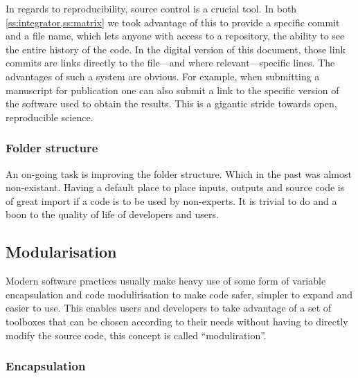 In regards to reproducibility, source control is a crucial tool. In both \cref{ss:integrator,ss:matrix} we took advantage of this to provide a specific commit and a file name, which lets anyone with access to a repository, the ability to see the entire history of the code. In the digital version of this document, those link commits are links directly to the file---and where relevant---specific lines. The advantages of such a system are obvious. For example, when submitting a manuscript for publication one can also submit a link to the specific version of the software used to obtain the results. This is a gigantic stride towards open, reproducible science.

\subsubsection{Folder structure}

An on-going task is improving the folder structure. Which in the past was almost non-existant. Having a default place to place inputs, outputs and source code is of great import if a code is to be used by non-experts. It is trivial to do and a boon to the quality of life of developers and users.

\subsection{Modularisation}

Modern software practices usually make heavy use of some form of variable encapsulation and code modulirisation to make code safer, simpler to expand and easier to use. This enables users and developers to take advantage of a set of toolboxes that can be chosen according to their needs without having to directly modify the source code, this concept is called ``moduliration''.

\subsubsection{Encapsulation}\label{ss:encapsulation}

